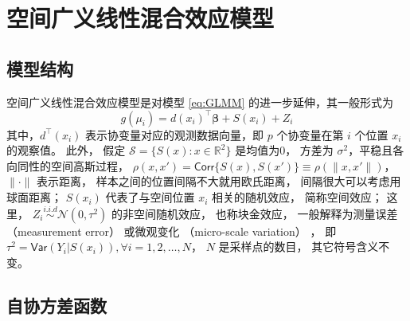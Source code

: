 \documentclass[12pt,a4paper,UTF8,twoside]{book}
\theoremstyle{definition}
\theoremstyle{definition}
\theoremstyle{definition}
\theoremstyle{remark}
\begin{document}
\hypertarget{sec:Spatial-Generalized-linear-mixed-effects-models}{%
\section{空间广义线性混合效应模型}\label{sec:Spatial-Generalized-linear-mixed-effects-models}}

\hypertarget{subsec:structure-sglmm}{%
\subsection{模型结构}\label{subsec:structure-sglmm}}

空间广义线性混合效应模型是对模型 \eqref{eq:GLMM}
的进一步延伸，其一般形式为 \begin{equation}
g(\mu_i) = d(x_i)^{\top}\boldsymbol{\beta} + S(x_i) + Z_i \label{eq:SGLMM}
\end{equation} \noindent 其中，\(d^{\top}(x_i)\)
表示协变量对应的观测数据向量，即 \(p\) 个协变量在第 \(i\) 个位置 \(x_i\)
的观察值。 此外， 假定 \(\mathcal{S} = \{S(x): x \in \mathbb{R}^2\}\)
是均值为0， 方差为 \(\sigma^2\)，平稳且各向同性的空间高斯过程，
\(\rho(x,x') = \mathsf{Corr}\{S(x),S(x')\} \equiv \rho(\|x,x'\|)\)，
\(\|\cdot\|\) 表示距离， 样本之间的位置间隔不大就用欧氏距离，
间隔很大可以考虑用球面距离； \(S(x_i)\) 代表了与空间位置 \(x_i\)
相关的随机效应， 简称空间效应； 这里，
\(Z_i \stackrel{i.i.d}{\sim} \mathcal{N}(0,\tau^2)\) 的非空间随机效应，
也称块金效应， 一般解释为测量误差 （measurement error） 或微观变化
（micro-scale variation） \citep{Christensen2004}， 即
\(\tau^2=\mathsf{Var}(Y_{i}|S(x_{i})),\forall i = 1,2, \ldots, N\)，
\(N\) 是采样点的数目， 其它符号含义不变。

\hypertarget{subsec:covariance-function}{%
\subsection{自协方差函数}\label{subsec:covariance-function}}
\end{document}

